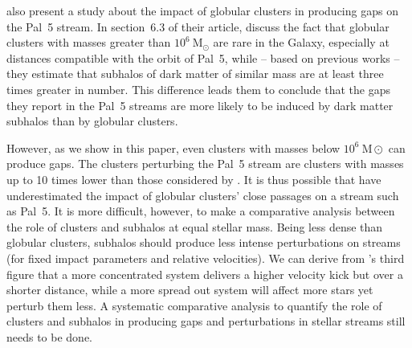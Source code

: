 \documentclass{aa}
\begin{document}
  \citet{2017MNRAS.470...60E} also present a study about the impact of globular clusters in producing gaps on the Pal~5 stream. In section~6.3 of their article, \citet{2017MNRAS.470...60E} discuss the fact that globular clusters with masses greater than $10^6~\textrm{M}_\odot$ are rare in the Galaxy, especially at distances compatible with the orbit of Pal~5, while -- based on previous works -- they estimate that subhalos of dark matter of similar mass are at least three times greater in number. This difference leads them to conclude that the gaps they report in the Pal~5 streams are more likely to be induced by dark matter subhalos than by globular clusters. 
  
  However, as we show in this paper, even clusters with masses below $10^6~\textrm{M}\odot$ can produce gaps. The clusters perturbing the Pal~5 stream are clusters with masses up to 10 times lower than those considered by \citet{2017MNRAS.470...60E}. It is thus possible that \citet{2017MNRAS.470...60E} have underestimated the impact of globular clusters' close passages on a stream such as Pal~5. It is more difficult, however, to make a comparative analysis between the role of clusters and subhalos at equal stellar mass. Being less dense than globular clusters, subhalos should produce less intense perturbations on streams (for fixed impact parameters and relative velocities). We can derive from \citet{2016MNRAS.457.3817S}'s third figure that a more concentrated system delivers a higher velocity kick but over a shorter distance, while a more spread out system will affect more stars yet perturb them less. A systematic comparative analysis to quantify the role of clusters and subhalos in producing gaps and perturbations in stellar streams still needs to be done.
\end{document}
